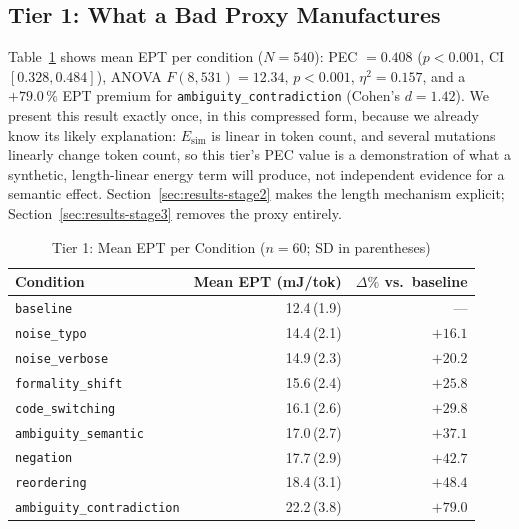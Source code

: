 \documentclass[conference]{IEEEtran}
\begin{document}
\subsection{Tier 1: What a Bad Proxy Manufactures}
\label{sec:results-stage1}
Table~\ref{tab:ept} shows mean EPT per condition ($N=540$): PEC
$=0.408$ ($p<0.001$, CI $[0.328,0.484]$), ANOVA $F(8,531)=12.34$,
$p<0.001$, $\eta^2=0.157$, and a $+79.0\,\%$ EPT premium for
\texttt{ambiguity\_contradiction} (Cohen's $d=1.42$). We present this
result exactly once, in this compressed form, because we already know
its likely explanation: $E_\text{sim}$ is linear in token count, and
several mutations linearly change token count, so this tier's PEC
value is a demonstration of what a synthetic, length-linear energy
term will produce, not independent evidence for a semantic effect.
Section~\ref{sec:results-stage2} makes the length mechanism explicit;
Section~\ref{sec:results-stage3} removes the proxy entirely.
\begin{table}[t]
\caption{Tier 1: Mean EPT per Condition ($n=60$; SD in parentheses)}
\label{tab:ept}
\centering
\setlength{\tabcolsep}{3pt}
\begin{tabular}{@{}lrr@{}}
\toprule
\textbf{Condition} & \textbf{Mean EPT (mJ/tok)} & \textbf{$\Delta\%$ vs.\ baseline} \\
\midrule
\texttt{baseline} & 12.4\,(1.9) & --- \\
\texttt{noise\_typo} & 14.4\,(2.1) & $+16.1$ \\
\texttt{noise\_verbose} & 14.9\,(2.3) & $+20.2$ \\
\texttt{formality\_shift} & 15.6\,(2.4) & $+25.8$ \\
\texttt{code\_switching} & 16.1\,(2.6) & $+29.8$ \\
\texttt{ambiguity\_semantic} & 17.0\,(2.7) & $+37.1$ \\
\texttt{negation} & 17.7\,(2.9) & $+42.7$ \\
\texttt{reordering} & 18.4\,(3.1) & $+48.4$ \\
\texttt{ambiguity\_contradiction} & 22.2\,(3.8) & $+79.0$ \\
\bottomrule
\end{tabular}
\end{table}
\end{document}
